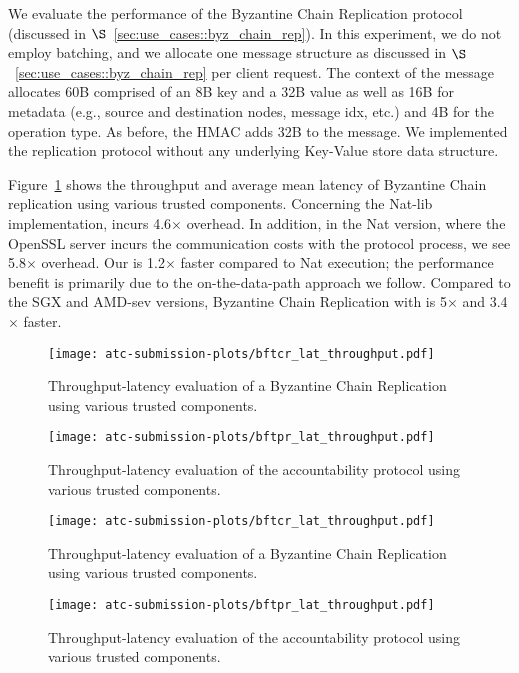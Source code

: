  We evaluate the performance of the Byzantine Chain Replication protocol (discussed in $\S$~\ref{sec:use_cases::byz_chain_rep}). %
In this experiment, we do not employ batching, and we allocate one message structure as discussed in $\S$~\ref{sec:use_cases::byz_chain_rep} per client request. The context of the message allocates 60B comprised of an 8B key and a 32B value as well as 16B for metadata (e.g., source and destination nodes, message idx, etc.) and 4B for the operation type. As before, the HMAC adds 32B to the message. We implemented the replication protocol without any underlying Key-Value store data structure.

 Figure~\ref{fig:byz_chain_replication} shows the throughput and average mean latency of Byzantine Chain replication using various trusted components. Concerning the Nat-lib implementation, \projecttitle{} incurs 4.6$\times$ overhead. In addition, in the Nat version, where the OpenSSL server incurs the communication costs with the protocol process, we see 5.8$\times$ overhead. Our \projecttitle{} is 1.2$\times$ faster compared to Nat execution; the performance benefit is primarily due to the on-the-data-path approach we follow.
Compared to the SGX and AMD-sev versions, Byzantine Chain Replication with \projecttitle{} is 5$\times$ and 3.4$\times$ faster.
\begin{figure}
    \centering
  \texttt{[image: atc-submission-plots/bftcr\_lat\_throughput.pdf]} 
    \caption{Throughput-latency evaluation of a Byzantine Chain Replication using various trusted components.} \label{fig:byz_chain_replication}
\end{figure}

\begin{figure}
  \texttt{[image: atc-submission-plots/bftpr\_lat\_throughput.pdf]} 
    \caption{Throughput-latency evaluation of the accountability protocol using various trusted components.} \label{fig:accountability_protocol}
\end{figure}

\begin{figure*}[t!]
\begin{center}
  \centering
  \texttt{[image: atc-submission-plots/bftcr\_lat\_throughput.pdf]} 
    \caption{Throughput-latency evaluation of a Byzantine Chain Replication using various trusted components.} \label{fig:byz_chain_replication}
\endminipage
{}
  \centering
  \texttt{[image: atc-submission-plots/bftpr\_lat\_throughput.pdf]} 
    \caption{Throughput-latency evaluation of the accountability protocol using various trusted components.} \label{fig:accountability_protocol}
\endminipage
\end{center}
\end{figure*}
\fi


